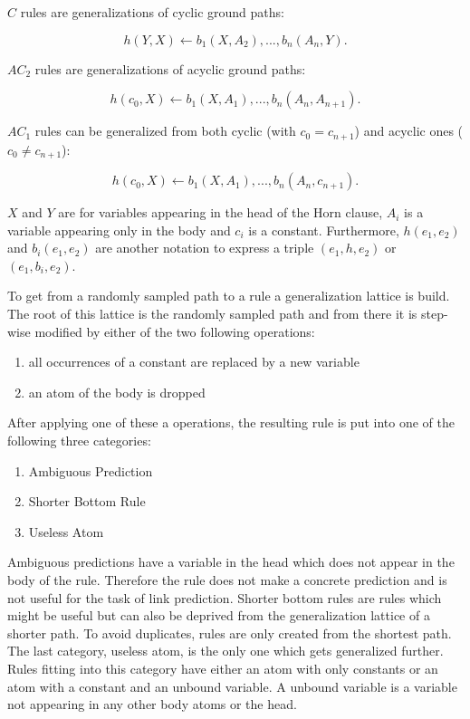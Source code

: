 $C$ rules are generalizations of cyclic 
ground paths:

\begin{equation}
h(Y,X) \leftarrow b_1(X, A_2), ..., b_n(A_n,Y).
\end{equation}

$AC_2$ rules are generalizations of acyclic ground paths:

\begin{equation}
h(c_0,X) \leftarrow b_1(X, A_1), ..., b_n(A_n,A_{n+1}).
\end{equation}
	
$AC_1$ rules can be generalized from both cyclic (with $c_0=c_{n+1}$) and acyclic ones ($c_0\neq c_{n+1}$):

\begin{equation}
h(c_0,X) \leftarrow b_1(X, A_1), ..., b_n(A_n,c_{n+1}).
\end{equation}

$X$ and $Y$ are for variables appearing in the head of the Horn clause, $A_i$ is a variable appearing only in the body and $c_i$ is a constant. Furthermore, $h(e_1,e_2)$ and $b_i(e_1,e_2)$ are another notation to express a triple $(e_1, h, e_2)$ or $(e_1, b_i, e_2)$. 

To get from a randomly sampled path to a rule a generalization lattice is build. The root of this lattice is the randomly sampled path and from there it is step-wise modified by either of the two following operations: 

\begin{enumerate}
\item all occurrences of a constant are replaced by a new variable 
\item an atom of the body is dropped
\end{enumerate}

After applying one of these a operations, the resulting rule is put into one of the following three categories:

\begin{enumerate}
\item Ambiguous Prediction
\item Shorter Bottom Rule
\item Useless Atom 
\end{enumerate}

Ambiguous predictions have a variable in the head which does not appear in the body of the rule. Therefore the rule does not make a concrete prediction and is not useful for the task of link prediction. Shorter bottom rules are rules which might be useful but can also be deprived from the generalization lattice of a shorter path. To avoid duplicates, rules are only created from the shortest path. The last category, useless atom, is the only one which gets generalized further. Rules fitting into this category have either an atom with only constants or an atom with a constant and an unbound variable. A unbound variable is a variable not appearing in any other body atoms or the head. 

